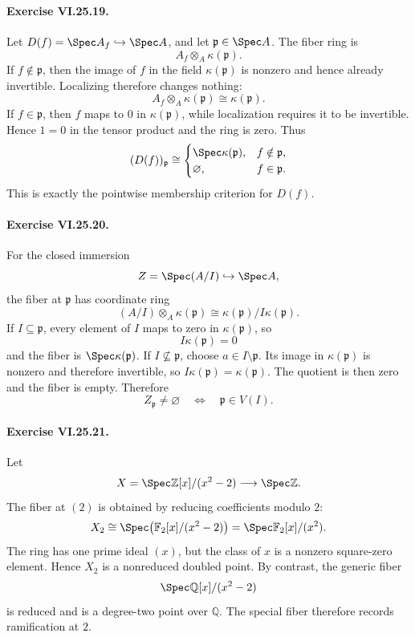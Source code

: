 \paragraph{Exercise VI.25.19.}
\begin{solution}
Let \(D(f)=\Spec A_f\hookrightarrow\Spec A\), and let \(\mathfrak p\in\Spec A\).  The fiber ring is
\[
A_f\otimes_A\kappa(\mathfrak p).
\]
If \(f\notin\mathfrak p\), then the image of \(f\) in the field \(\kappa(\mathfrak p)\) is nonzero and hence already invertible.  Localizing therefore changes nothing:
\[
A_f\otimes_A\kappa(\mathfrak p)\cong\kappa(\mathfrak p).
\]
If \(f\in\mathfrak p\), then \(f\) maps to \(0\) in \(\kappa(\mathfrak p)\), while localization requires it to be invertible.  Hence \(1=0\) in the tensor product and the ring is zero.  Thus
\[
(D(f))_{\mathfrak p}
\cong
\begin{cases}
\Spec\kappa(\mathfrak p),& f\notin\mathfrak p,\\
\varnothing,& f\in\mathfrak p.
\end{cases}
\]
This is exactly the pointwise membership criterion for \(D(f)\).
\end{solution}

\paragraph{Exercise VI.25.20.}
\begin{solution}
For the closed immersion
\[
Z=\Spec(A/I)\hookrightarrow\Spec A,
\]
the fiber at \(\mathfrak p\) has coordinate ring
\[
(A/I)\otimes_A\kappa(\mathfrak p)
\cong
\kappa(\mathfrak p)/I\kappa(\mathfrak p).
\]
If \(I\subseteq\mathfrak p\), every element of \(I\) maps to zero in \(\kappa(\mathfrak p)\), so
\[
I\kappa(\mathfrak p)=0
\]
and the fiber is \(\Spec\kappa(\mathfrak p)\).  If \(I\nsubseteq\mathfrak p\), choose \(a\in I\setminus\mathfrak p\).  Its image in \(\kappa(\mathfrak p)\) is nonzero and therefore invertible, so \(I\kappa(\mathfrak p)=\kappa(\mathfrak p)\).  The quotient is then zero and the fiber is empty.  Therefore
\[
Z_{\mathfrak p}\ne\varnothing
\quad\Longleftrightarrow\quad
\mathfrak p\in V(I).
\]
\end{solution}

\paragraph{Exercise VI.25.21.}
\begin{solution}
Let
\[
X=\Spec\mathbb Z[x]/(x^2-2)\longrightarrow\Spec\mathbb Z.
\]
The fiber at \((2)\) is obtained by reducing coefficients modulo \(2\):
\[
X_2
\cong
\Spec\!\left(\mathbb F_2[x]/(x^2-2)\right)
=
\Spec\mathbb F_2[x]/(x^2).
\]
The ring has one prime ideal \((x)\), but the class of \(x\) is a nonzero square-zero element.  Hence \(X_2\) is a nonreduced doubled point.  By contrast, the generic fiber
\[
\Spec\mathbb Q[x]/(x^2-2)
\]
is reduced and is a degree-two point over \(\mathbb Q\).  The special fiber therefore records ramification at \(2\).
\end{solution}

